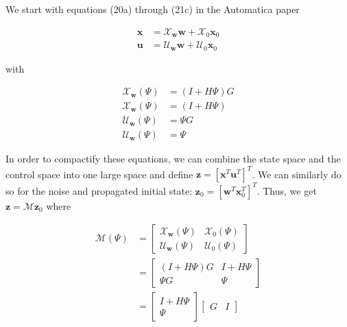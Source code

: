 \documentclass[]{article}
\begin{document}
We start with equations (20a) through (21c) in the Automatica paper

\newcommand{\state}{\bm{x}}
\newcommand{\Xw}{\bm{\mathcal{X}_w}}
\newcommand{\Xo}{\bm{\mathcal{X}}_0}

\newcommand{\control}{\bm{u}}
\newcommand{\Uw}{\bm{\mathcal{U}_w}}
\newcommand{\Uo}{\bm{\mathcal{U}}_0}

\newcommand{\noise}{\bm{w}}
\newcommand{\init}{\bm{x}_0}

\begin{align}
	\state &= \Xw\noise + \Xo\init \\
	\control &= \Uw\noise + \Uo\init
\end{align}

with

\begin{align}
	\Xw(\Psi) &= (I + H\Psi)G \\
	\Xw(\Psi) &= (I + H\Psi) \\
	\Uw(\Psi) &= \Psi G \\
	\Uw(\Psi) &= \Psi
\end{align}

\newcommand{\statecontrol}{\bm{z}}
\newcommand{\zo}{\bm{z}_0}

In order to compactify these equations, we can combine the state space and the control space into one large space and define $\statecontrol = [\state^T \control^T]^T$.
We can similarly do so for the noise and propagated initial state: $\zo = [\noise^T \init^T]^T$.
\newcommand{\mapper}{\mathcal{M}}
Thus, we get $\statecontrol = \mapper \zo$ where

\begin{equation}
\begin{aligned}
	\mapper(\Psi) &=
	\begin{bmatrix} \Xw(\Psi) & \Xo(\Psi) \\ \Uw(\Psi) & \Uo(\Psi)
	\end{bmatrix} \\ 
	&=
	\begin{bmatrix}
		(I + H\Psi)G & I + H\Psi \\
		\Psi G & \Psi
	\end{bmatrix} \\
	&=
	\begin{bmatrix} I + H\Psi \\ \Psi
	\end{bmatrix}
	\begin{bmatrix} G & I
	\end{bmatrix}
\end{aligned}
\end{equation}
\end{document}
